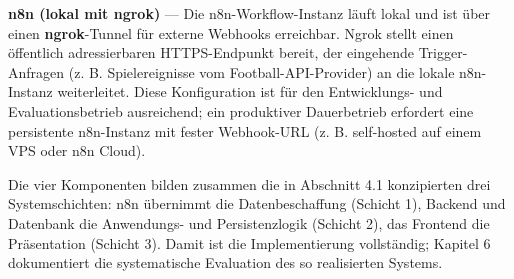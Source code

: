 \textbf{n8n (lokal mit ngrok)} --- Die n8n-Workflow-Instanz läuft lokal
und ist über einen \textbf{ngrok}-Tunnel für externe Webhooks
erreichbar. Ngrok stellt einen öffentlich adressierbaren HTTPS-Endpunkt
bereit, der eingehende Trigger-Anfragen (z. B. Spielereignisse vom
Football-API-Provider) an die lokale n8n-Instanz weiterleitet. Diese
Konfiguration ist für den Entwicklungs- und Evaluationsbetrieb
ausreichend; ein produktiver Dauerbetrieb erfordert eine persistente
n8n-Instanz mit fester Webhook-URL (z. B. self-hosted auf einem VPS oder
n8n Cloud).

Die vier Komponenten bilden zusammen die in Abschnitt 4.1 konzipierten
drei Systemschichten: n8n übernimmt die Datenbeschaffung (Schicht 1),
Backend und Datenbank die Anwendungs- und Persistenzlogik (Schicht 2),
das Frontend die Präsentation (Schicht 3). Damit ist die Implementierung
vollständig; Kapitel 6 dokumentiert die systematische Evaluation des so
realisierten Systems.
